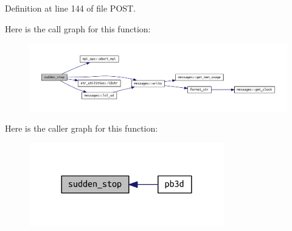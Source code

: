 Definition at line 144 of file P\+O\+S\+T.

Here is the call graph for this function\+:
\nopagebreak
\begin{figure}[H]
\begin{center}
\leavevmode
\includegraphics[width=350pt]{POST_8f90_aaee67c546b34b4095587a626df7b98c2_cgraph}
\end{center}
\end{figure}
Here is the caller graph for this function\+:
\nopagebreak
\begin{figure}[H]
\begin{center}
\leavevmode
\includegraphics[width=240pt]{POST_8f90_aaee67c546b34b4095587a626df7b98c2_icgraph}
\end{center}
\end{figure}
